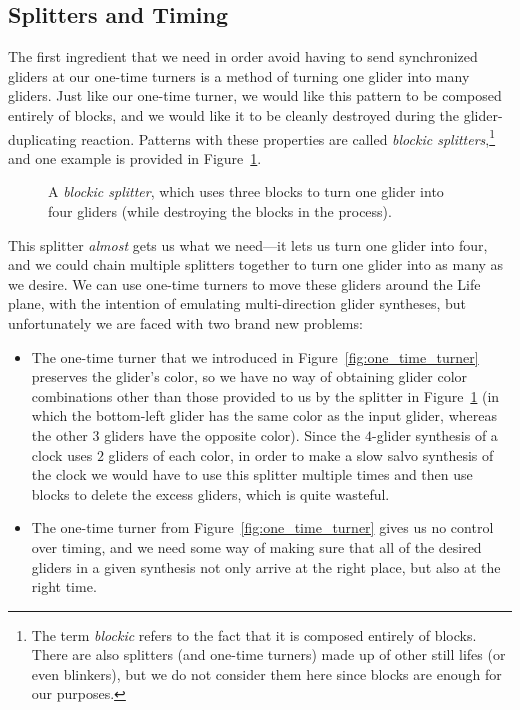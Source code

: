 \subsection{Splitters and Timing}\label{sec:slow_salvo_splitters}

The first ingredient that we need in order avoid having to send synchronized gliders at our one-time turners is a method of turning one glider into many gliders. Just like our one-time turner, we would like this pattern to be composed entirely of blocks, and we would like it to be cleanly destroyed during the glider-duplicating reaction. Patterns with these properties are called \emph{blockic splitters},\footnote{The term \emph{blockic} refers to the fact that it is composed entirely of blocks. There are also splitters (and one-time turners) made up of other still lifes (or even blinkers), but we do not consider them here since blocks are enough for our purposes.} and one example is provided in Figure~\ref{fig:one_time_splitter}.

\begin{figure}[!htb]
	\centering{}
	\caption{A \emph{blockic splitter}, which uses three blocks to turn one glider into four gliders (while destroying the blocks in the process).}\label{fig:one_time_splitter}
\end{figure}

This splitter \emph{almost} gets us what we need---it lets us turn one glider into four, and we could chain multiple splitters together to turn one glider into as many as we desire. We can use one-time turners to move these gliders around the Life plane, with the intention of emulating multi-direction glider syntheses, but unfortunately we are faced with two brand new problems:\smallskip

\begin{itemize}
	\item The one-time turner that we introduced in Figure~\ref{fig:one_time_turner} preserves the glider's color, so we have no way of obtaining glider color combinations other than those provided to us by the splitter in Figure~\ref{fig:one_time_splitter} (in which the bottom-left glider has the same color as the input glider, whereas the other $3$ gliders have the opposite color). Since the $4$-glider synthesis of a clock uses $2$ gliders of each color, in order to make a slow salvo synthesis of the clock we would have to use this splitter multiple times and then use blocks to delete the excess gliders, which is quite wasteful.\smallskip
	
	\item The one-time turner from Figure~\ref{fig:one_time_turner} gives us no control over timing, and we need some way of making sure that all of the desired gliders in a given synthesis not only arrive at the right place, but also at the right time.\smallskip
\end{itemize}

